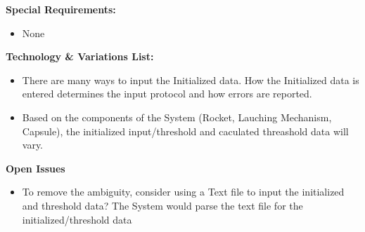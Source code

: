 \documentclass[letterpaper]{article}
\begin{document}
\textbf{Special Requirements: }
\begin{itemize}
\item None
\end{itemize}
\textbf{Technology \& Variations List: }
\begin{itemize}
\item[1c] There are many ways to input the Initialized data.
How the Initialized data is entered determines the input protocol
and how errors are reported.
\item[1d] Based on the components of the System (Rocket,
Lauching Mechanism, Capsule), the initialized input/threshold and
caculated threashold data will vary.
\end{itemize}
\textbf{Open Issues}
\begin{itemize}
\item To remove the ambiguity, consider using a Text file to
input the initialized and threshold data?  The System would parse the
text file for the initialized/threshold data
\end{itemize}
\end{document}
